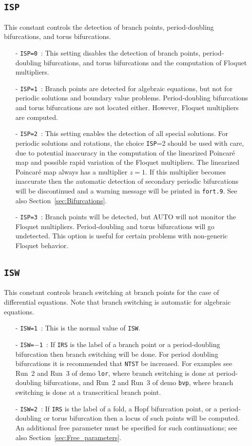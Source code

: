 \documentclass[12pt]{report}
\begin{document}
\subsection{\tt ISP}  \label{sec:ISP}
This constant controls the detection of branch points,
period-doubling bifurcations, and torus bifurcations. 
\begin{itemize}
\item[-] {\tt ISP=0}~:  
  This setting disables the detection of branch points, period-doubling 
  bifurcations, and torus bifurcations and the computation of 
  Floquet multipliers.
\item[-] {\tt ISP=1}~:  
  Branch points are detected for algebraic equations, but not for
  periodic solutions and boundary value problems.
  Period-doubling bifurcations and torus bifurcations are not located either.
  However, Floquet multipliers are computed.
\item[-] {\tt ISP=2}~: This setting enables the detection of all special 
 solutions.
 For periodic solutions and rotations, the choice {\tt ISP}=2 should be used with
 care, due to potential inaccuracy in the computation of the
 linearized Poincar\'e map and possible rapid variation of the
 Floquet multipliers.
 The linearized Poincar\'e map always has a multiplier $z=1$.
 If this multiplier becomes inaccurate
 then the automatic detection of secondary periodic
 bifurcations will be discontinued and a
 warning message will be printed in {\tt fort.9}.
 See also Section~\ref{sec:Bifurcations}.
\item[-] {\tt ISP=3}~:  
  Branch points will be detected, but {\cal AUTO} will not monitor the 
  Floquet multipliers. Period-doubling and torus bifurcations will go undetected. 
  This option is useful for certain problems with non-generic Floquet behavior.
\end{itemize}

\subsection{\tt ISW}  \label{sec:ISW}
 This constant controls branch switching at branch points for the case
 of differential equations.
 Note that branch switching is automatic for algebraic equations.
\begin{itemize}
\item[-] {\tt ISW=1}~: This is the normal value of {\tt ISW}.
\item[-] {\tt ISW=$-$1}~:
  If {\tt IRS} is the label of a branch point or a period-doubling
  bifurcation then branch switching will be done.
  For period doubling bifurcations it is recommended that {\tt NTST} be increased.
  For examples see Run~2 and Run~3 of demo {\tt lor}, where branch switching
  is done at period-doubling bifurcations, and Run~2 and Run~3 of demo {\tt bvp},
  where branch switching is done at a transcritical branch point.
\item[-] {\tt ISW=2}~:
  If {\tt IRS} is the label of a fold, a Hopf bifurcation point, 
  or a period-doubling or torus bifurcation then a locus of such points will be
  computed. An additional free parameter must be specified for such 
  continuations; see also Section~\ref{sec:Free_parameters}.
\end{itemize}
\end{document}
